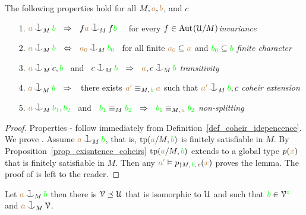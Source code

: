 \begin{lemma}\label{lem_coheir_independence}
    The following properties hold for all $M,{\color{brown} a},{\color{brown} b}$, and $c$
    \begin{itemize}
    \item[1.] ${\mr a}\cnonfork_M{\gr b}\ \ \IMP\ \ f{\mr a}\cnonfork_Mf{\gr b}$ \ \ 
              for every $f\in{\rm Aut\kern.15ex}(\EuScript U/M)$\hfill \textit{invariance}
    \item[2.] ${\mr a}\cnonfork_M{\gr b}\ \ \IFF\ \ {\mr a_0}\cnonfork_M{\gr b_0}$
              \ for all finite ${\color{brown} a_0}\subseteq{\color{brown}a}$ and 
              ${\color{green} b_0}\subseteq{\color{green}b}$ \hfill\textit{finite character}
    \item[3.] ${\mr a}\cnonfork_Mc,{\gr b}$ \ and \ 
              $c\cnonfork_M{\gr b}\ \ \IMP\ \ {\mr a},c\cnonfork_M{\gr b}$
              \hfill\hfill\hfill\textit{transitivity}
    \item[4.] ${\mr a}\cnonfork_M{\gr b}\ \ \IMP\ \ $ 
              there exists ${\color{brown} a'}\equiv_{M,\,{\color{green} b}}{\color{brown} a}$ such that 
              ${\mr a'}\cnonfork_M{\gr b},c$
              \textit{coheir extension}
    \item[5.] ${\mr a}\cnonfork_M{\gr b_1},{\gr b_2}$ \ and \ 
    ${\color{green} b_1}\equiv_M{\color{green} b_2}\ \ \Rightarrow\ \ {\color{green} b_1}\equiv_{M,\,{\color{brown} a}}{\color{green} b_2}$
              \hspace{\stretch{20}}\textit{non-splitting}
    \end{itemize}
    \end{lemma}
\begin{proof}

Properties - follow immediately from Definition~\ref{def_coheir_idepencence}.
We prove .
Assume ${\mr a}\cnonfork_M{\gr b}$, that is,  ${\rm tp}({\color{brown} a}/M,{\color{green} b})$ is finitely satisfiable in $M$.
By Proposition~\ref{prop_exisntence_coheirs} ${\rm tp}({\color{brown} a}/M,{\color{green} b})$ extends to a global type $p({\color{brown} x})$ that is finitely satisfiable in $M$.
Then any ${\color{brown} a'}\vDash p_{\restriction M,\,{\color{green} b},\,c}({\color{brown} x})$ proves the lemma.
The proof of \ssf{5} is left to the reader.
\end{proof}

\begin{proposition}\label{prop_saturate_heir}
  Let ${\mr a}\cnonfork_M{\gr b}$ then there is $\EuScript V\preceq\EuScript U$ that is isomorphic to $\EuScript U$ and such that ${\color{green} b}\in\EuScript V^{\color{green} z}$ and ${\mr a}\cnonfork_M\V$.
\end{proposition}

